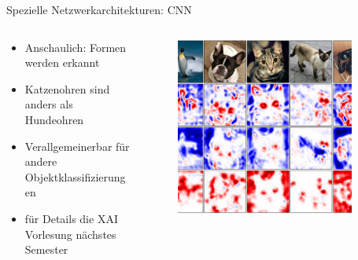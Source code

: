 \documentclass[aspectratio=1610, xcolor=dvipsnames, 9pt]{beamer}
\begin{document}
      \begin{frame}{Spezielle Netzwerkarchitekturen: CNN}
        \begin{columns}
          \begin{column}{0.5\textwidth}
            \begin{itemize}
              \item Anschaulich: Formen werden erkannt \newline 
              \item Katzenohren sind anders als Hundeohren \newline 
              \item Verallgemeinerbar für andere Objektklassifizierungen \newline
              \item für Details die XAI Vorlesung nächstes Semester
            \end{itemize}
          \end{column}
           \begin{column}{0.5\textwidth}
             \begin{figure}
               \centering
                           \includegraphics[width=0.9\textwidth]{images/featuremaps.jpg}
               \end{figure}

           \end{column}
        \end{columns}
      \end{frame}
\end{document}
